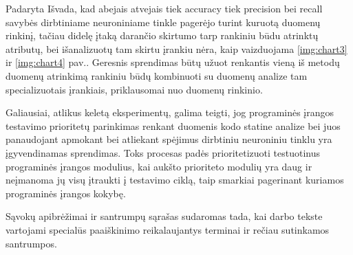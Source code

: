 \documentclass{VUMIFPSbakalaurinis}
\begin{document}
Padaryta Išvada, kad abejais atvejais tiek accuracy tiek precision bei recall savybės dirbtiniame neuroniniame tinkle pagerėjo turint kuruotą duomenų rinkinį, tačiau didelę įtaką darančio skirtumo tarp rankiniu būdu atrinktų atributų, bei išanalizuotų tam skirtu įrankiu nėra, kaip vaizduojama \ref{img:chart3} ir \ref{img:chart4} pav.. Geresnis sprendimas būtų užuot renkantis vieną iš metodų duomenų atrinkimą rankiniu būdų kombinuoti su duomenų analize tam specializuotais įrankiais, priklausomai nuo duomenų rinkinio. 

Galiausiai, atlikus keletą eksperimentų, galima teigti, jog programinės įrangos testavimo prioritetų parinkimas renkant duomenis kodo statine analize bei juos panaudojant apmokant bei atliekant spėjimus dirbtiniu neuroniniu tinklu yra įgyvendinamas sprendimas. Toks procesas padės prioritetizuoti testuotinus programinės įrangos modulius, kai aukšto prioriteto modulių yra daug ir neįmanoma jų visų įtraukti į testavimo ciklą, taip smarkiai pagerinant kuriamos programinės įrangos kokybę.

\printbibliography[heading=bibintoc]  %

Sąvokų apibrėžimai ir santrumpų sąrašas sudaromas tada, kai darbo tekste
vartojami specialūs paaiškinimo reikalaujantys terminai ir rečiau sutinkamos
santrumpos.

\appendix  %
\end{document}

